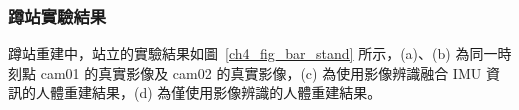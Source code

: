 
\clearpage

\subsubsection*{蹲站實驗結果}
蹲站重建中，站立的實驗結果如圖~\ref{ch4_fig_bar_stand} 所示，(a)、(b) 為同一時刻點 cam01 的真實影像及 cam02 的真實影像，(c) 為使用影像辨識融合 IMU 資訊的人體重建結果，(d) 為僅使用影像辨識的人體重建結果。

